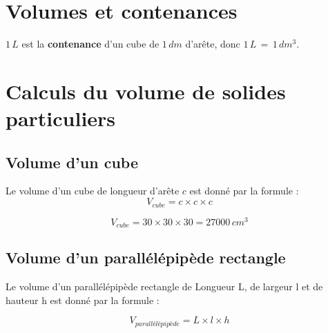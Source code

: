 \documentclass[a4paper,dvipsnames]{article}
\begin{document}
\section{Volumes et contenances}

\begin{Pp}
$1\,L$ est la \textbf{contenance} d’un cube de $1\,dm$ d’arête, donc $1\,L\,=\,1\,dm^3$.
\end{Pp}

\section{Calculs du volume de solides particuliers}

\subsection{Volume d'un cube}

\begin{Pp}
Le volume d'un cube de longueur d'arête $c$
est donné par la formule :
\[V_{cube}=c\times c\times c\]

\begin{center}
\end{center}
\end{Pp}

\begin{Ex}
\begin{center}
\end{center}
\[V_{cube}=30\times30\times30=27000\,cm^3\]
\end{Ex}

\subsection{Volume d'un parallélépipède rectangle}

\begin{Pp}
Le volume d'un parallélépipède rectangle de Longueur L, de largeur l et de hauteur h est donné par la formule :

\[V_{parallélépipède}=L\times l\times h\]

\begin{center}
\end{center}
\end{Pp}
\end{document}

